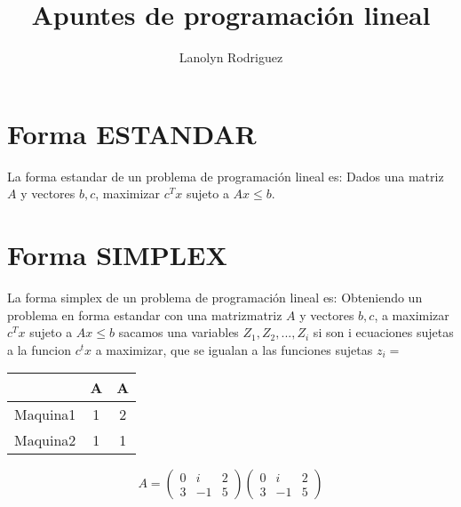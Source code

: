 \documentclass{article}
\title{Apuntes de programación lineal}
\author{Lanolyn Rodriguez}
\begin{document}
\maketitle
\tableofcontents
\section{Forma ESTANDAR}
\label{sec:informacion-que-cura}

La forma estandar de un problema de programación lineal es: Dados una
matriz $A$ y vectores $b,c$, maximizar $c^Tx$ sujeto a $Ax\leq b$.



\section{Forma SIMPLEX}
\label{sec:informacion-que-cura}

La forma simplex de un problema de programación lineal es: Obteniendo un
problema en forma estandar con una matrizmatriz $A$ y vectores $b,c$, a
maximizar $c^Tx$ sujeto a $Ax\leq b$ sacamos una variables
$Z_1,Z_2,...,Z_i$ si son i ecuaciones sujetas a la funcion $c^tx$ a maximizar, que se
igualan a las funciones sujetas $z_i=$


\begin{tabular}{|c|c|c|}
  \hline
  & A & A \\
  \hline
  Maquina1 & 1 & 2 \\
  Maquina2 & 1 & 1 \\
  \hline               
\end{tabular}

\begin{equation}
  A=
  \label{eq:1}
  \begin{pmatrix}
    0&i&2\\
    3&-1&5
  \end{pmatrix}
\begin{pmatrix}
  0&i&2\\
  3&-1&5
  \end{pmatrix}
\end{equation}
\end{document}
